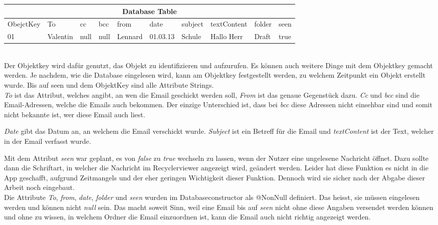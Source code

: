 \documentclass[a4paper,11pt]{article}
\begin{document}
\begin{tabular}{ |p{1.6cm}  |p{1.1cm} |p{1.1cm} |p{1.05cm} |p{1.15cm} |p{1.15cm} |p{1.25cm} |p{1.75cm} |p{1.25cm} |p{1.15cm}|}
 \hline
 \multicolumn{10}{|c|}{Database Table} \\
 \hline
    ObejctKey &To & cc & bcc & from & date & subject & textContent & folder & seen  \\
 \hline
     01    &Valentin& null & null & Lennard & 01.03.13 & Schule &  Hallo Herr & Draft & true \\
 \hline
\end{tabular} \\

Der Objektkey wird dafür genutzt, das Objekt zu identifizieren und aufzurufen. Es können auch weitere Dinge mit dem Objektkey gemacht werden. 
Je nachdem, wie die Database eingelesen wird, kann am Objektkey festgestellt werden, zu welchem Zeitpunkt ein Objekt erstellt wurde. Bis auf seen und dem ObjektKey sind 
alle Attribute Strings. \\

\textit{To} ist das Attribut, welches angibt, an wen die Email geschickt werden soll, \textit{From} ist das genaue Gegenstück dazu. \textit{Cc} und \textit{bcc} sind die 
Email-Adressen, welche die Emails auch bekommen. Der einzige Unterschied ist, dass bei \textit{bcc} diese Adressen nicht einsehbar sind und somit nicht bekannte ist, wer diese Email auch liest. 

\textit{Date} gibt das Datum an, an welchem die Email verschickt wurde. \textit{Subject} ist ein Betreff für die Email und \textit{textContent} ist der Text, welcher in der Email verfasst wurde. 

Mit dem Attribut \textit{seen} war geplant, es von \textit{false} zu \textit{true} wechseln zu lassen, wenn der Nutzer eine ungelesene Nachricht öffnet. Dazu sollte dann die Schriftart,
in welcher die Nachricht im Recyclerviewer angezeigt wird, geändert werden. Leider hat diese Funktion es nicht in die App geschafft, aufgrund Zeitmangels und der eher 
geringen Wichtigkeit dieser Funktion. Dennoch wird sie sicher nach der Abgabe dieser Arbeit noch eingebaut. \\

Die Attribute \textit{To}, \textit{from}, \textit{date}, \textit{folder} und \textit{seen} wurden im Databaseconstructor als @NonNull definiert. Das heisst, sie müssen eingelesen werden und können 
nicht \textit{null} sein. Das macht soweit Sinn, weil eine Email bis auf \textit{seen} nicht ohne diese Angaben versendet werden können und ohne zu wissen, in welchem Ordner die Email einzuordnen ist,
kann die Email auch nicht richtig angezeigt werden. \\
\end{document}

